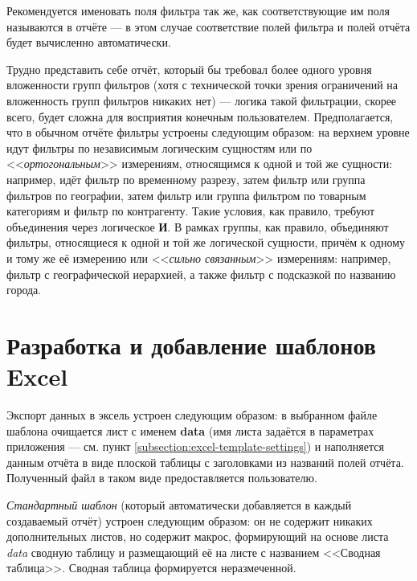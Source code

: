 \documentclass[../user-manual.tex]{subfiles}
\begin{document}
	\begin{devnote}
		Рекомендуется именовать поля фильтра так же, как соответствующие им поля называются в отчёте --- в этом случае соответствие полей фильтра и полей отчёта будет вычисленно автоматически.
	\end{devnote}

	\begin{concept}
		Трудно представить себе отчёт, который бы требовал более одного уровня вложенности групп фильтров (хотя с технической точки зрения ограничений на вложенность групп фильтров никаких нет) --- логика такой фильтрации, скорее всего, будет сложна для восприятия конечным пользователем. Предполагается, что в обычном отчёте фильтры устроены следующим образом: на верхнем уровне идут фильтры по независимым логическим сущностям или по <<\textit{ортогональным}>> измерениям, относящимся к одной и той же сущности: например, идёт фильтр по временн\textit{о}му разрезу, затем фильтр или группа фильтров по географии, затем фильтр или группа фильтром по товарным категориям и фильтр по контрагенту. Такие условия, как правило, требуют объединения через логическое \textbf{И}. В рамках группы, как правило, объединяют фильтры, относящиеся к одной и той же логической сущности, причём к одному и тому же её измерению или <<\textit{сильно связанным}>> измерениям: например, фильтр с географической иерархией, а также фильтр с подсказкой по названию города.
	\end{concept}
	
	\section{Разработка и добавление шаблонов Excel}\label{developing:customized-excel-templates}
	
	Экспорт данных в эксель устроен следующим образом: в выбранном файле шаблона очищается лист с именем \textbf{data} (имя листа задаётся в параметрах приложения --- см. пункт \ref{subsection:excel-template-settings}) и наполняется данным отчёта в виде плоской таблицы с заголовками из названий полей отчёта. Полученный файл в таком виде предоставляется пользователю.
	
	\textit{Стандартный шаблон} (который автоматически добавляется в каждый создаваемый отчёт) устроен следующим образом: он не содержит никаких дополнительных листов, но содержит макрос, формирующий на основе листа \textit{data} сводную таблицу и размещающий её на листе с названием <<Сводная таблица>>. Сводная таблица формируется неразмеченной.
	
\end{document}

